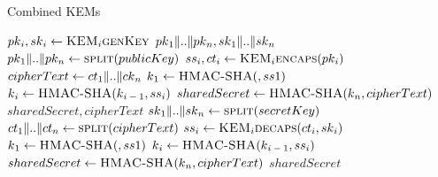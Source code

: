 \documentclass[a4paper,11pt]{article}
\begin{document}
\begin{algorithm}
\caption{Combined KEMs}
\begin{algorithmic}
  \Statex
      \State $pk\textsubscript{$i$},sk\textsubscript{$i$} \gets \Call{KEM\textup{\textsubscript{$i$}}genKey}{}$
    \EndFor
    \State \Return $pk\textsubscript{$1$} \Arrowvert .. \Arrowvert pk\textsubscript{$n$}, sk\textsubscript{$1$} \Arrowvert .. \Arrowvert sk\textsubscript{$n$}$
  \EndFunction
  \Statex
    \State $pk\textsubscript{$1$} \Arrowvert .. \Arrowvert pk\textsubscript{$n$} \gets \Call{split}{publicKey}$
    \Statex
      \State $ss\textsubscript{$i$},ct\textsubscript{$i$} \gets \Call{KEM\textup{\textsubscript{$i$}}encaps}{pk\textsubscript{$i$}}$
    \EndFor
    \State $cipherText \gets ct\textsubscript{1} \Arrowvert .. \Arrowvert ck\textsubscript{$n$}$
    \Statex
    \State $k\textsubscript{1} \gets \Call{HMAC-SHA}{ , ss1}$
      \State $k\textsubscript{$i$} \gets \Call{HMAC-SHA}{ k\textsubscript{$i-1$}, ss\textsubscript{$i$}}$
    \EndFor
    \State $sharedSecret \gets \Call{HMAC-SHA}{ k\textsubscript{$n$}, cipherText}$
    \Statex
    \State \Return $sharedSecret,cipherText$
  \EndFunction
  \Statex
    \State $sk\textsubscript{$1$} \Arrowvert .. \Arrowvert sk\textsubscript{$n$} \gets \Call{split}{secretKey}$
    \State $ct\textsubscript{$1$} \Arrowvert .. \Arrowvert ct\textsubscript{$n$} \gets \Call{split}{cipherText}$
    \Statex
      \State $ss\textsubscript{$i$} \gets \Call{KEM\textup{\textsubscript{$i$}}decaps}{ct\textsubscript{$i$}, sk\textsubscript{$i$}}$
    \EndFor
    \Statex
    \State $k\textsubscript{1} \gets \Call{HMAC-SHA}{ , ss1}$
      \State $k\textsubscript{$i$} \gets \Call{HMAC-SHA}{ k\textsubscript{$i-1$}, ss\textsubscript{$i$}}$
    \EndFor
    \State $sharedSecret \gets \Call{HMAC-SHA}{ k\textsubscript{$n$}, cipherText}$
    \Statex
    \State \Return $sharedSecret$
  \EndFunction
  \end{algorithmic}
  \end{algorithm}
  \FloatBarrier
\end{document}
